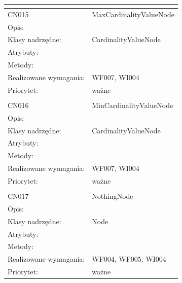 \documentclass[a4paper,10pt]{article}
\begin{document}
\begin{center}
\begin{longtable}{|m{3cm}|m{9cm}|}
\multicolumn{2}{c}{} \\
 \hline

CN015 & MaxCardinalityValueNode \\ \hline
Opis: &     \\ \hline
Klasy nadrzędne: & CardinalityValueNode     \\ \hline
Atrybuty: & %
 \\ \hline
Metody: & %
  \\ \hline
Realizowane wymagania: & WF007, WI004 \\ \hline
Priorytet: & ważne  \\ \hline

\multicolumn{2}{c}{} \\
 \hline

CN016 & MinCardinalityValueNode \\ \hline
Opis: &     \\ \hline
Klasy nadrzędne: & CardinalityValueNode     \\ \hline
Atrybuty: & %
 \\ \hline
Metody: & %
  \\ \hline
Realizowane wymagania: & WF007, WI004 \\ \hline
Priorytet: & ważne  \\ \hline

\multicolumn{2}{c}{} \\
 \hline

CN017 & NothingNode \\ \hline
Opis: &     \\ \hline
Klasy nadrzędne: & Node     \\ \hline
Atrybuty: & %
 \\ \hline
Metody: & %
  \\ \hline
Realizowane wymagania: & WF004, WF005, WI004 \\ \hline
Priorytet: & ważne  \\ \hline


\end{longtable}
\end{center}
\end{document}
